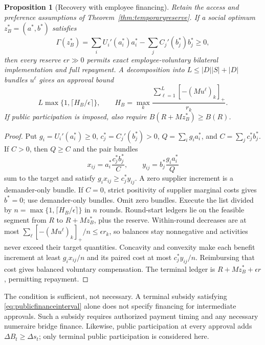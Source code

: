 \documentclass[ecta,draft,supplement]{econsocart}
\newtheorem{proposition}[theorem]{Proposition}
\theoremstyle{definition}
\theoremstyle{definition}
\begin{document}
\begin{appendix}
\begin{proposition}[Recovery with employee financing]
\label{prop:valuedrecovery}
Retain the access and preference assumptions of
Theorem~\ref{thm:temporaryreserve}. If a social optimum $z_B^*=(a^*,b^*)$
satisfies
\[
 \Gamma(z_B^*)=\sum_iU_i'(a_i^*)a_i^*
                 -\sum_jC_j'(b_j^*)b_j^*\geq0,
\]
then every reserve $\epsilon r\gg0$ permits exact employee-voluntary
bilateral implementation and full repayment. A decomposition into
$L\leq|D||S|+|D|$ bundles $u^\ell$ gives an approval bound
\[
 L\max\{1,\lceil H_B/\epsilon\rceil\},\qquad
 H_B=\max_k\frac{\sum_{\ell=1}^L[-(Mu^\ell)_k]_+}{r_k}.
\]
If public participation is imposed, also require
$B(R+Mz_B^*)\geq B(R)$.
\end{proposition}
\begin{proof}
Put $g_i=U_i'(a_i^*)\geq0$, $c_j^*=C_j'(b_j^*)>0$,
$Q=\sum_i g_i a_i^*$, and $C=\sum_jc_j^*b_j^*$. If $C>0$, then
$Q\geq C$ and the pair bundles
\[
 x_{ij}=a_i^*\frac{c_j^*b_j^*}{C},\qquad
 y_{ij}=b_j^*\frac{g_i a_i^*}{Q}
\]
sum to the target and satisfy $g_ix_{ij}\geq c_j^*y_{ij}$.
A zero supplier increment is a demander-only bundle. If $C=0$, strict
positivity of supplier marginal costs gives $b^*=0$; use demander-only
bundles. Omit zero bundles. Execute the list divided by
$n=\max\{1,\lceil H_B/\epsilon\rceil\}$ in $n$ rounds.
Round-start ledgers lie on the feasible segment from $R$ to $R+Mz_B^*$,
plus the reserve. Within-round decreases are at most
$\sum_\ell[-(Mu^\ell)_k]_+/n\leq\epsilon r_k$, so balances stay
nonnegative and activities never exceed their target quantities.
Concavity and convexity make each benefit increment at least
$g_ix_{ij}/n$ and its paired cost at most $c_j^*y_{ij}/n$.
Reimbursing that cost gives balanced voluntary compensation.
The terminal ledger is $R+Mz_B^*+\epsilon r$, permitting repayment.
\end{proof}

The condition is sufficient, not necessary. A terminal subsidy satisfying
\eqref{eq:publicfinanceinterval} alone does not specify financing for
intermediate approvals. Such a subsidy requires authorized payment timing
and any necessary numeraire bridge finance. Likewise, public participation
at every approval adds $\Delta B_t\geq\Delta s_t$; only terminal public
participation is considered here.


\end{appendix}
\end{document}
